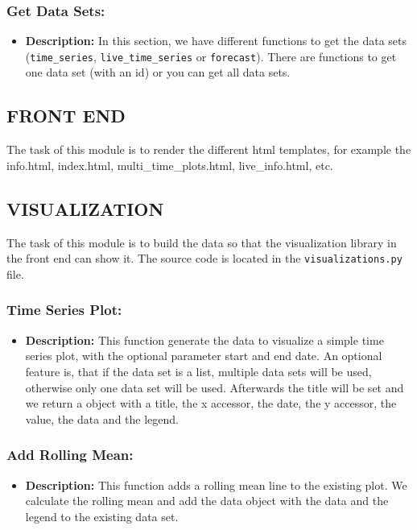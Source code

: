 \documentclass[11pt, a4paper]{article}
\begin{document}
\subsubsection*{Get Data Sets:}
\begin{itemize}
 \item[] \textbf{Description:} In this section, we have different functions to get the data sets (\texttt{time\_series}, \texttt{live\_time\_series} or \texttt{forecast}). 
 There are functions to get one data set (with an id) or you can get all data sets.
\end{itemize}


\subsection{FRONT END}
The task of this module is to render the different html templates, for example the info.html, index.html, multi\_time\_plots.html, live\_info.html, etc.


\subsection{VISUALIZATION}
The task of this module is to build the data so that the visualization library in the front end can show it.
The source code is located in the \texttt{visualizations.py} file.


\subsubsection*{Time Series Plot:}
\begin{itemize}
 \item[] \textbf{Description:} This function generate the data to visualize a simple time series plot, with the optional parameter start and end date.
An optional feature is, that if the data set is a list, multiple data sets will be used, otherwise only one data set will be used.
Afterwards the title will be set and we return a object with a title, the x accessor, the date, the y accessor, the value,
the data and the legend.
\end{itemize}


\subsubsection*{Add Rolling Mean:}
\begin{itemize}
 \item[] \textbf{Description:} This function adds a rolling mean line to the existing plot. 
 We calculate the rolling mean and add the data object with the data and the legend to the existing data set.
\end{itemize}
\end{document}
